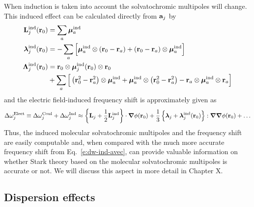 \documentclass[a4paper,titlepage,twoside,fleqn,12pt]{book}
\newcommand{\BM}[1]{\ensuremath{\mbox{\boldmath${#1}$}}}
\begin{document}
\begin{refsection}
When induction is taken into account the solvatochromic multipoles
will change. This induced effect can be calculated directly from
${\bf a}_j$ by
%
\begin{subequations}
\begin{align}
{\bf L}_j^{\rm ind}({\bf r}_0)       &=   \sum_a {\BM \mu}_a^{\rm ind} \\
{\BM \lambda}_j^{\rm ind}({\bf r}_0) &= - \sum_a \Big[ {\BM \mu}_a^{\rm ind} \otimes \left( {\bf r}_0 
                                       - {\bf r}_a \right) + \left( {\bf r}_0 
                                       - {\bf r}_a \right) \otimes {\BM \mu}_a^{\rm ind} \Big] \\
{\BM \Lambda}_j^{\rm ind}({\bf r}_0) &=   {\bf r}_0 \otimes {\BM \mu}_j^{\rm ind}({\bf r}_0) \otimes {\bf r}_0 \nonumber \\ 
                                    &  + \sum_a \Big[ \left( {\bf r}_0^2 - {\bf r}_a^2 \right) \otimes {\BM \mu}_a^{\rm ind} 
                                       + {\BM \mu}_a^{\rm ind} \otimes \left( {\bf r}_0^2 - {\bf r}_a^2 \right) 
                                       - {\bf r}_a \otimes {\BM \mu}_a^{\rm ind} \otimes {\bf r}_a \Big]
\end{align}
\end{subequations}
%
and the electric field\hyp{}induced frequency shift 
is approximately given as
%
\begin{equation} \label{e:dmtp-solmmm-ind}
 \Delta\omega_j^{\rm Elect} \equiv  \Delta\omega_j^{\rm Coul} +  \Delta\omega_j^{\rm Ind} \approx  
                       \left\{ {\bf L}_j + \frac{1}{2} {\bf L}_j^{\rm ind} \right\} 
                       \cdot {\BM \nabla} \phi({\bf r}_0)   + 
      \frac{1}{3} \left\{ {\BM \lambda}_j + {\BM \lambda}_j^{\rm ind}({\bf r}_0) \right\} 
                           : {\BM \nabla}  {\BM \nabla} \phi({\bf r}_0)   +   \ldots
\end{equation}
%
Thus, the induced molecular solvatochromic multipoles and the frequency shift
are easily computable and, when compared with the much more accurate
frequency shift from Eq.~\eqref{e:dw-ind-avec}, can provide valuable 
information on whether Stark theory based on the molecular
solvatochromic multipoles is accurate or not. We will discuss 
this aspect in more detail in Chapter X.

\subsection{Dispersion effects\label{s:disp}}


\end{refsection}
\end{document}
